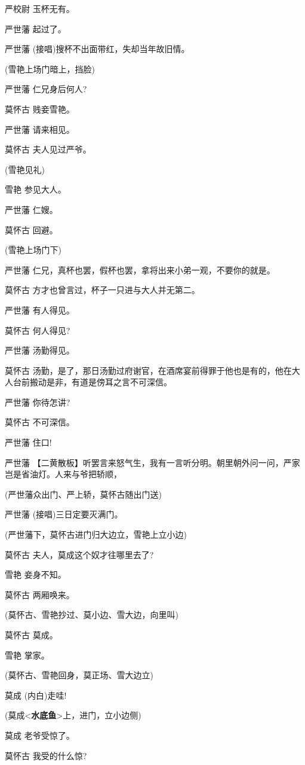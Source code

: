 严校尉 玉杯无有。

严世藩 起过了。

严世藩 (接唱)搜杯不出面带红，失却当年故旧情。

(雪艳上场门暗上，挡脸)

严世藩 仁兄身后何人?

莫怀古 贱妾雪艳。

严世藩 请来相见。

莫怀古 夫人见过严爷。

(雪艳见礼)

雪艳 参见大人。

严世藩 仁嫂。

莫怀古 回避。

(雪艳上场门下)

严世藩 仁兄，真杯也罢，假杯也罢，拿将出来小弟一观，不要你的就是。

莫怀古 方才也曾言过，杯子一只进与大人并无第二。

严世藩 有人得见。

莫怀古 何人得见?

严世藩 汤勤得见。

莫怀古
汤勤，是了，那日汤勤过府谢官，在酒席宴前得罪于他也是有的，他在大人台前搬动是非，有道是傍耳之言不可深信。

严世藩 你待怎讲?

莫怀古 不可深信。

严世藩 住口!

严世藩
【二黄散板】听罢言来怒气生，我有一言听分明。朝里朝外问一问，严家岂是省油灯。人来与爷把轿顺，

(严世藩众出门、严上轿，莫怀古随出门送)

严世藩 (接唱)三日定要灭满门。

(严世藩下，莫怀古进门归大边立，雪艳上立小边)

莫怀古 夫人，莫成这个奴才往哪里去了?

雪艳 妾身不知。

莫怀古 两厢唤来。

(莫怀古、雪艳抄过、莫小边、雪大边，向里叫)

莫怀古 莫成。

雪艳 掌家。

(莫怀古、雪艳回身，莫正场、雪大边立)

莫成 (内白)走哇!

(莫成\textless{}\textbf{水底鱼}\textgreater{}上，进门，立小边侧)

莫成 老爷受惊了。

莫怀古 我受的什么惊?

